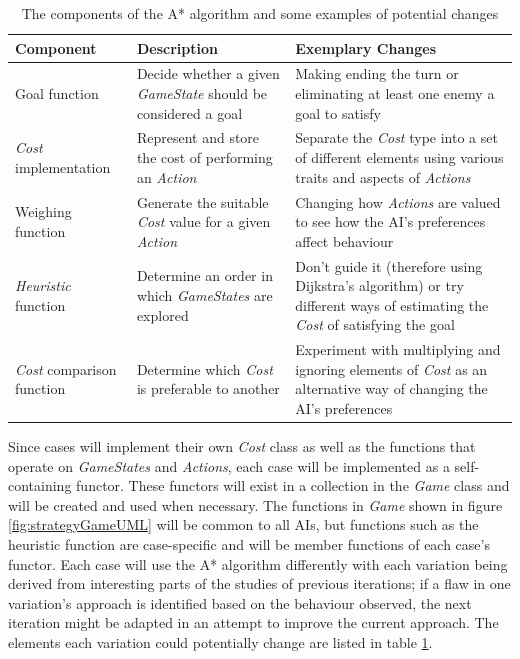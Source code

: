 \documentclass[11pt, a4paper]{report}
\begin{document}
\begin{table}[!h]
  \centering
  \begin{tabular}{ | m{2.5cm} | m{4cm} | m{6cm} |}
    \hline
    \textbf{Component} & \textbf{Description} & \textbf{Exemplary Changes} \\ \hline
    Goal function & Decide whether a given \emph{GameState} should be considered a goal & Making ending the turn or eliminating at least one enemy a goal to satisfy \\ \hline
    \emph{Cost} implementation & Represent and store the cost of performing an \emph{Action} & Separate the \emph{Cost} type into a set of different elements using various traits and aspects of \emph{Actions} \\ \hline
    Weighing function & Generate the suitable \emph{Cost} value for a given \emph{Action} & Changing how \emph{Actions} are valued to see how the AI's preferences affect behaviour \\ \hline
    \emph{Heuristic} function & Determine an order in which \emph{GameStates} are explored & Don't guide it (therefore using Dijkstra's algorithm) or try different ways of estimating the \emph{Cost} of satisfying the goal \\ \hline
    \emph{Cost} comparison function & Determine which \emph{Cost} is preferable to another & Experiment with multiplying and ignoring elements of \emph{Cost} as an alternative way of changing the AI's preferences \\
    \hline
  \end{tabular}
  \caption{The components of the A* algorithm and some examples of potential changes}
  \label{table:designingAStarVariations}
\end{table}

Since cases will implement their own \emph{Cost} class as well as the functions that operate on \emph{GameStates} and \emph{Actions}, each case will be implemented as a self-containing functor. These functors will exist in a collection in the \emph{Game} class and will be created and used when necessary. The functions in \emph{Game} shown in figure \ref{fig:strategyGameUML} will be common to all AIs, but functions such as the heuristic function are case-specific and will be member functions of each case's functor. Each case will use the A* algorithm differently with each variation being derived from interesting parts of the studies of previous iterations; if a flaw in one variation's approach is identified based on the behaviour observed, the next iteration might be adapted in an attempt to improve the current approach. The elements each variation could potentially change are listed in table \ref{table:designingAStarVariations}.  
\end{document}
